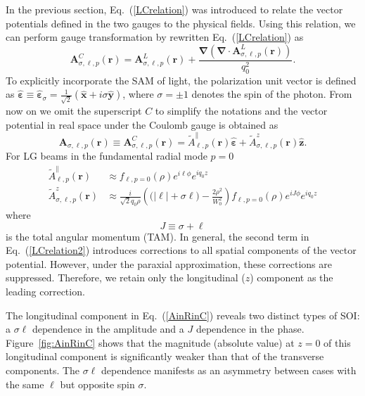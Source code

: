 In the previous section, Eq.~(\ref{LCrelation}) was introduced to relate the vector potentials defined in the two gauges to the physical fields. Using this relation, we can perform gauge transformation by rewritten Eq.~(\ref{LCrelation}) as
\begin{equation}
\boldsymbol{A}^{C}_{\sigma, \ell, p}(\boldsymbol{r})
=
\boldsymbol{A}^{L}_{\sigma, \ell, p}(\boldsymbol{r})
+
\frac{\boldsymbol{\nabla}
\left(
\boldsymbol{\nabla}\cdot
\boldsymbol{A}^{L}_{\sigma, \ell, p}(\boldsymbol{r})
\right)}
{q_0^2}.
\label{LCrelation2}
\end{equation}
To explicitly incorporate the SAM of light, the polarization unit vector is defined as
$\hat{\boldsymbol{\varepsilon}}\equiv\hat{\boldsymbol{\varepsilon}}_{\sigma}=\frac{1}{\sqrt{2}}(\hat{\boldsymbol{x}}+i\sigma\hat{\boldsymbol{y}})$,
where $\sigma=\pm1$ denotes the spin of the photon. From now on we omit the superscript $C$ to simplify the notations and the vector potential in real space under the Coulomb gauge is obtained as
\begin{equation}
\boldsymbol{A}_{\sigma, \ell, p}(\boldsymbol{r})
\equiv 
\boldsymbol{A}^{C}_{\sigma, \ell, p}(\boldsymbol{r})
=\tilde{A}^{\parallel}_{\ell, p}(\boldsymbol{r}) \hat{\boldsymbol{\varepsilon}} + \tilde{A}^{z}_{\sigma, \ell, p}(\boldsymbol{r}) \hat{\boldsymbol{z}}.
\end{equation}
For LG beams in the fundamental radial mode $p=0$ 
\begin{equation} 
\begin{aligned}
\tilde{A}^{\parallel}_{\ell, p}(\boldsymbol{r})
&\approx 
f_{\ell,p=0}(\rho)e^{i\ell \phi}e^{i q_0 z}\\
\tilde{A}^{z}_{\sigma, \ell, p}(\boldsymbol{r})
&\approx
\frac{i}{\sqrt{2}q_0\rho}
\left(
\bigl(|\ell|+\sigma \ell\bigr)-\frac{2\rho^2}{W_0^2}
\right)
f_{\ell,p=0}(\rho)
e^{i J\phi}e^{i q_0 z}
\end{aligned}
\label{AinRinC} %
\end{equation}
where
\[
J\equiv \sigma+\ell
\]
is the total angular momentum (TAM). In general, the second term in Eq.~(\ref{LCrelation2}) introduces corrections to all spatial components of the vector potential. However, under the paraxial approximation, these corrections are suppressed. Therefore, we retain only the longitudinal ($z$) component as the leading correction.

The longitudinal component in Eq.~(\ref{AinRinC}) reveals two distinct types of SOI: a $\sigma\ell$ dependence in the amplitude and a $J$ dependence in the phase. Figure~\ref{fig:AinRinC} shows that the magnitude (absolute value) at $z=0$ of this longitudinal component is significantly weaker than that of the transverse components. The $\sigma\ell$ dependence manifests as an asymmetry between cases with the same $\ell$ but opposite spin $\sigma$.

